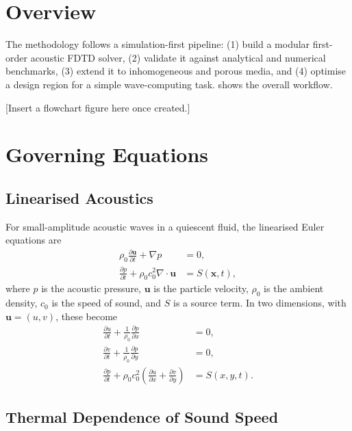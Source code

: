 
\section{Overview}
\label{sec:meth_overview}

The methodology follows a simulation-first pipeline: (1) build a modular first-order acoustic FDTD solver, (2) validate it against analytical and numerical benchmarks, (3) extend it to inhomogeneous and porous media, and (4) optimise a design region for a simple wave-computing task.  shows the overall workflow.

[Insert a flowchart figure here once created.]

\section{Governing Equations}
\label{sec:governing_eqns}

\subsection{Linearised Acoustics}
\label{subsec:linear_acoustics}

For small-amplitude acoustic waves in a quiescent fluid, the linearised Euler equations are
\begin{align}
    \rho_0 \frac{\partial \mathbf{u}}{\partial t} + \nabla p &= 0, \\
    \frac{\partial p}{\partial t} + \rho_0 c_0^2 \nabla \cdot \mathbf{u} &= S(\mathbf{x}, t),
\end{align}
where $p$ is the acoustic pressure, $\mathbf{u}$ is the particle velocity, $\rho_0$ is the ambient density, $c_0$ is the speed of sound, and $S$ is a source term. In two dimensions, with $\mathbf{u} = (u, v)$, these become
\begin{align}
    \frac{\partial u}{\partial t} + \frac{1}{\rho_0}\frac{\partial p}{\partial x} &= 0, \\
    \frac{\partial v}{\partial t} + \frac{1}{\rho_0}\frac{\partial p}{\partial y} &= 0, \\
    \frac{\partial p}{\partial t} + \rho_0 c_0^2 \left(\frac{\partial u}{\partial x} + \frac{\partial v}{\partial y}\right) &= S(x,y,t).
\end{align}

\subsection{Thermal Dependence of Sound Speed}
\label{subsec:thermal_c}

